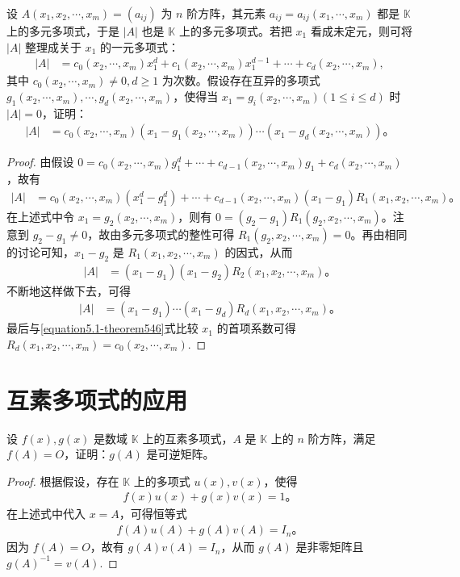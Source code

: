 \documentclass[lang=cn,newtx,10pt,scheme=chinese]{elegantbook}
\begin{document}
\begin{theorem}[行列式的求根法]\label{theorem:行列式的求根法}
设 $A(x_1, x_2, \cdots, x_m) = (a_{ij})$ 为 $n$ 阶方阵，其元素 $a_{ij} = a_{ij}(x_1, \cdots, x_m)$ 都是 $\mathbb{K}$ 上的多元多项式，于是 $|A|$ 也是 $\mathbb{K}$ 上的多元多项式。若把 $x_1$ 看成未定元，则可将 $|A|$ 整理成关于 $x_1$ 的一元多项式：
\begin{align}
|A| &= c_0(x_2, \cdots, x_m)x_1^d + c_1(x_2, \cdots, x_m)x_1^{d-1} + \cdots + c_d(x_2, \cdots, x_m),\label{equation5.1-theorem546}
\end{align}
其中 $c_0(x_2, \cdots, x_m) \neq 0, d \geq 1$ 为次数。假设存在互异的多项式 $g_1(x_2, \cdots, x_m), \cdots, g_d(x_2, \cdots, x_m)$，使得当 $x_1 = g_i(x_2, \cdots, x_m) (1 \leq i \leq d)$ 时 $|A| = 0$，证明：
\begin{align*}
|A| &= c_0(x_2, \cdots, x_m)(x_1 - g_1(x_2, \cdots, x_m)) \cdots (x_1 - g_d(x_2, \cdots, x_m))。
\end{align*}
\end{theorem}
\begin{proof}
由假设 $0 = c_0(x_2, \cdots, x_m)g_1^d + \cdots + c_{d-1}(x_2, \cdots, x_m)g_1 + c_d(x_2, \cdots, x_m)$，故有
\begin{align*}
|A| &= c_0(x_2, \cdots, x_m)(x_1^d - g_1^d) + \cdots + c_{d-1}(x_2, \cdots, x_m)(x_1 - g_1)R_1(x_1, x_2, \cdots, x_m)。
\end{align*}
在上述式中令 $x_1 = g_2(x_2, \cdots, x_m)$，则有 $0 = (g_2 - g_1)R_1(g_2, x_2, \cdots, x_m)$。注意到 $g_2 - g_1 \neq 0$，故由多元多项式的整性可得 $R_1(g_2, x_2, \cdots, x_m) = 0$。再由相同的讨论可知，$x_1 - g_2$ 是 $R_1(x_1, x_2, \cdots, x_m)$ 的因式，从而
\begin{align*}
|A| &= (x_1 - g_1)(x_1 - g_2)R_2(x_1, x_2, \cdots, x_m)。
\end{align*}
不断地这样做下去，可得
\begin{align*}
|A| &= (x_1 - g_1) \cdots (x_1 - g_d)R_d(x_1, x_2, \cdots, x_m)。
\end{align*}
最后与\eqref{equation5.1-theorem546}式比较 $x_1$ 的首项系数可得 $R_d(x_1, x_2, \cdots, x_m) = c_0(x_2, \cdots, x_m)$.
\end{proof}


\section{互素多项式的应用}

\begin{proposition}
设 $f(x), g(x)$ 是数域 $\mathbb{K}$ 上的互素多项式，$A$ 是 $\mathbb{K}$ 上的 $n$ 阶方阵，满足 $f(A) = O$，证明：$g(A)$ 是可逆矩阵。
\end{proposition}
\begin{proof}
根据假设，存在 $\mathbb{K}$ 上的多项式 $u(x), v(x)$，使得
\begin{align*}
f(x)u(x) + g(x)v(x) = 1。
\end{align*}
在上述式中代入 $x = A$，可得恒等式
\begin{align*}
f(A)u(A) + g(A)v(A) = I_n。
\end{align*}
因为 $f(A) = O$，故有 $g(A)v(A) = I_n$，从而 $g(A)$ 是非零矩阵且 $g(A)^{-1} = v(A)$.
\end{proof}
\end{document}
